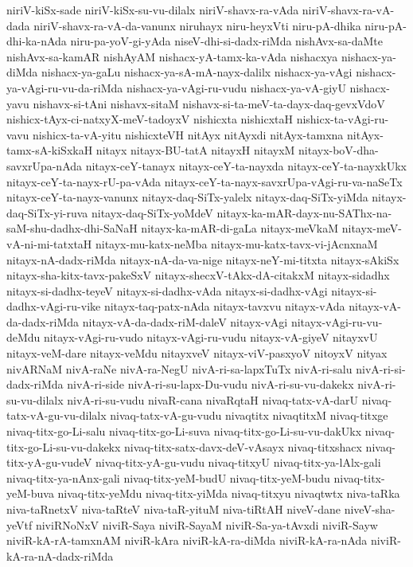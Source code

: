 {niriV-kiSx-sade
niriV-kiSx-su-vu-dilalx
niriV-shavx-ra-vAda
niriV-shavx-ra-vA-dada
niriV-shavx-ra-vA-da-vanunx
niruhayx
niru-heyxVti
niru-pA-dhika
niru-pA-dhi-ka-nAda
niru-pa-yoV-gi-yAda
niseV-dhi-si-dadx-riMda
nishAvx-sa-daMte
nishAvx-sa-kamAR
nishAyAM
nishacx-yA-tamx-ka-vAda
nishacxya
nishacx-ya-diMda
nishacx-ya-gaLu
nishacx-ya-sA-mA-nayx-dalilx
nishacx-ya-vAgi
nishacx-ya-vAgi-ru-vu-da-riMda
nishacx-ya-vAgi-ru-vudu
nishacx-ya-vA-giyU
nishacx-yavu
nishavx-si-tAni
nishavx-sitaM
nishavx-si-ta-meV-ta-dayx-daq-gevxVdoV
nishicx-tAyx-ci-natxyX-meV-tadoyxV
nishicxta
nishicxtaH
nishicx-ta-vAgi-ru-vavu
nishicx-ta-vA-yitu
nishicxteVH
nitAyx
nitAyxdi
nitAyx-tamxna
nitAyx-tamx-sA-kiSxkaH
nitayx
nitayx-BU-tatA
nitayxH
nitayxM
nitayx-boV-dha-savxrUpa-nAda
nitayx-ceY-tanayx
nitayx-ceY-ta-nayxda
nitayx-ceY-ta-nayxkUkx
nitayx-ceY-ta-nayx-rU-pa-vAda
nitayx-ceY-ta-nayx-savxrUpa-vAgi-ru-va-naSeTx
nitayx-ceY-ta-nayx-vanunx
nitayx-daq-SiTx-yalelx
nitayx-daq-SiTx-yiMda
nitayx-daq-SiTx-yi-ruva
nitayx-daq-SiTx-yoMdeV
nitayx-ka-mAR-dayx-nu-SAThx-na-saM-shu-dadhx-dhi-SaNaH
nitayx-ka-mAR-di-gaLa
nitayx-meVkaM
nitayx-meV-vA-ni-mi-tatxtaH
nitayx-mu-katx-neMba
nitayx-mu-katx-tavx-vi-jAcnxnaM
nitayx-nA-dadx-riMda
nitayx-nA-da-va-nige
nitayx-neY-mi-titxta
nitayx-sAkiSx
nitayx-sha-kitx-tavx-pakeSxV
nitayx-shecxV-tAkx-dA-citakxM
nitayx-sidadhx
nitayx-si-dadhx-teyeV
nitayx-si-dadhx-vAda
nitayx-si-dadhx-vAgi
nitayx-si-dadhx-vAgi-ru-vike
nitayx-taq-patx-nAda
nitayx-tavxvu
nitayx-vAda
nitayx-vA-da-dadx-riMda
nitayx-vA-da-dadx-riM-daleV
nitayx-vAgi
nitayx-vAgi-ru-vu-deMdu
nitayx-vAgi-ru-vudo
nitayx-vAgi-ru-vudu
nitayx-vA-giyeV
nitayxvU
nitayx-veM-dare
nitayx-veMdu
nitayxveV
nitayx-viV-pasxyoV
nitoyxV
nityax
nivARNaM
nivA-raNe
nivA-ra-NegU
nivA-ri-sa-lapxTuTx
nivA-ri-salu
nivA-ri-si-dadx-riMda
nivA-ri-side
nivA-ri-su-lapx-Du-vudu
nivA-ri-su-vu-dakekx
nivA-ri-su-vu-dilalx
nivA-ri-su-vudu
nivaR-cana
nivaRqtaH
nivaq-tatx-vA-darU
nivaq-tatx-vA-gu-vu-dilalx
nivaq-tatx-vA-gu-vudu
nivaqtitx
nivaqtitxM
nivaq-titxge
nivaq-titx-go-Li-salu
nivaq-titx-go-Li-suva
nivaq-titx-go-Li-su-vu-dakUkx
nivaq-titx-go-Li-su-vu-dakekx
nivaq-titx-satx-davx-deV-vAsayx
nivaq-titxshacx
nivaq-titx-yA-gu-vudeV
nivaq-titx-yA-gu-vudu
nivaq-titxyU
nivaq-titx-ya-lAlx-gali
nivaq-titx-ya-nAnx-gali
nivaq-titx-yeM-budU
nivaq-titx-yeM-budu
nivaq-titx-yeM-buva
nivaq-titx-yeMdu
nivaq-titx-yiMda
nivaq-titxyu
nivaqtwtx
niva-taRka
niva-taRnetxV
niva-taRteV
niva-taR-yituM
niva-tiRtAH
niveV-dane
niveV-sha-yeVtf
niviRNoNxV
niviR-Saya
niviR-SayaM
niviR-Sa-ya-tAvxdi
niviR-Sayw
niviR-kA-rA-tamxnAM
niviR-kAra
niviR-kA-ra-diMda
niviR-kA-ra-nAda
niviR-kA-ra-nA-dadx-riMda
}
